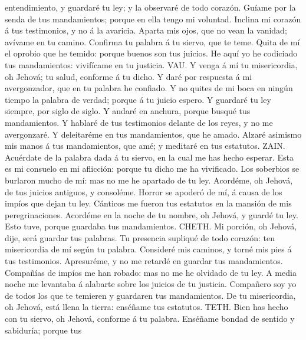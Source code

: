 entendimiento, y guardaré tu ley; y la observaré de todo corazón.
 Guíame por la senda de tus mandamientos; porque en ella
tengo mi voluntad.  Inclina mi corazón á tus testimonios, y
no á la avaricia.  Aparta mis ojos, que no vean la vanidad;
avívame en tu camino.  Confirma tu palabra á tu siervo, que
te teme.  Quita de mí el oprobio que he temido: porque
buenos son tus juicios.  He aquí yo he codiciado tus
mandamientos: vivifícame en tu justicia.  VAU. Y venga á mí
tu misericordia, oh Jehová; tu salud, conforme á tu dicho. 
Y daré por respuesta á mi avergonzador, que en tu palabra he confiado.
 Y no quites de mi boca en ningún tiempo la palabra de
verdad; porque á tu juicio espero.  Y guardaré tu ley
siempre, por siglo de siglo.  Y andaré en anchura, porque
busqué tus mandamientos.  Y hablaré de tus testimonios
delante de los reyes, y no me avergonzaré.  Y deleitaréme
en tus mandamientos, que he amado.  Alzaré asimismo mis
manos á tus mandamientos, que amé; y meditaré en tus estatutos.
 ZAIN. Acuérdate de la palabra dada á tu siervo, en la cual
me has hecho esperar.  Esta es mi consuelo en mi aflicción:
porque tu dicho me ha vivificado.  Los soberbios se
burlaron mucho de mí: mas no me he apartado de tu ley. 
Acordéme, oh Jehová, de tus juicios antiguos, y consoléme. 
Horror se apoderó de mí, á causa de los impíos que dejan tu ley.
 Cánticos me fueron tus estatutos en la mansión de mis
peregrinaciones.  Acordéme en la noche de tu nombre, oh
Jehová, y guardé tu ley.  Esto tuve, porque guardaba tus
mandamientos.  CHETH. Mi porción, oh Jehová, dije, será
guardar tus palabras.  Tu presencia supliqué de todo
corazón: ten misericordia de mí según tu palabra. 
Consideré mis caminos, y torné mis pies á tus testimonios. 
Apresuréme, y no me retardé en guardar tus mandamientos. 
Compañías de impíos me han robado: mas no me he olvidado de tu ley.
 A media noche me levantaba á alabarte sobre los juicios de
tu justicia.  Compañero soy yo de todos los que te temieren
y guardaren tus mandamientos.  De tu misericordia, oh
Jehová, está llena la tierra: enséñame tus estatutos. 
TETH. Bien has hecho con tu siervo, oh Jehová, conforme á tu palabra.
 Enséñame bondad de sentido y sabiduría; porque tus
